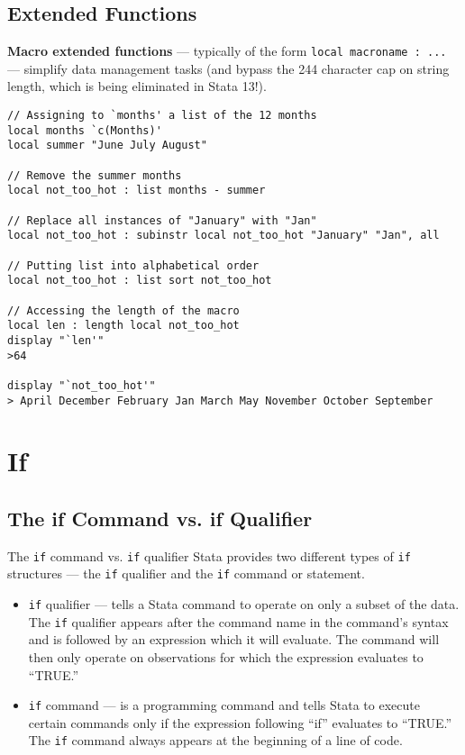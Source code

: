 \documentclass[fleqn, handout, 10pt]{beamer}
\def\lst{\lstinline}
\begin{document}
\subsection{Extended Functions}

\begin{frame}[fragile]
    \textbf{Macro extended functions} --- typically of the form \lst=local macroname : ...= --- simplify data management tasks (and bypass the 244 character cap on string length, which is being eliminated in Stata 13!).
    \begin{lstlisting}
// Assigning to `months' a list of the 12 months
local months `c(Months)'
local summer "June July August"

// Remove the summer months
local not_too_hot : list months - summer

// Replace all instances of "January" with "Jan"
local not_too_hot : subinstr local not_too_hot "January" "Jan", all

// Putting list into alphabetical order
local not_too_hot : list sort not_too_hot

// Accessing the length of the macro
local len : length local not_too_hot
display "`len'"
>64

display "`not_too_hot'"
> April December February Jan March May November October September
    \end{lstlisting}
\end{frame}


\section{If}

\subsection{The if Command vs. if Qualifier}

\begin{frame}[fragile]{The \lst=if= command vs. \lst=if= qualifier}
    Stata provides two different types of \lst=if= structures --- the \lst=if= qualifier and the \lst=if= command or statement.
    \begin{itemize}
	\item \lst=if= qualifier --- tells a Stata command to operate on only a subset of the data. The \lst=if= qualifier appears after the command name in the command's syntax and is followed by an expression which it will evaluate. The command will then only operate on observations for which the expression evaluates to ``TRUE.''
	\item \lst=if= command --- is a programming command and tells Stata to execute certain commands only if the expression following ``if'' evaluates to ``TRUE.'' The \lst=if= command always appears at the beginning of a line of code.
    \end{itemize}
\end{frame}
\end{document}
